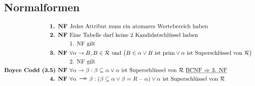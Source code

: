 \documentclass{article}
\newcommand{\fvd}{\mathlarger{\ \mathlarger{\twoheadrightarrow}}\ }
\begin{document}
		\subsection*{Normalformen}
			\begin{align*}
				\textbf{1. NF } & \text{Jedes Attribut muss ein atomares Wertebereich haben}\\
				\textbf{2. NF } & \text{Eine Tabelle darf keine 2 Kandidatschl\"ussel haben}\\
				& \text{1. NF gilt}\\
				\textbf{3. NF } & \forall \alpha \rightarrow B, B \in \mathcal{R} \text{ und } \big(B \in \alpha \vee B \text{ ist prim} \vee \alpha \text{ ist Superschl\"ussel von } \mathcal{R}\big)\\
				& \text{2. NF gilt}\\
				\textbf{Boyce Codd (3.5) NF } & \forall \alpha\rightarrow\beta:\beta\subseteq\alpha\vee\alpha\text{ ist Superschl\"ussel von }\mathcal{R}\ \underline{\text{BCNF $\Rightarrow $ 3. NF}}\\
				\textbf{4. NF } & \forall \alpha\fvd\beta: (\beta\subseteq \alpha\vee \beta = R - \alpha) \vee \alpha \text{ ist Superschl\"ussel von }\mathcal{R}
			\end{align*}
\end{document}
